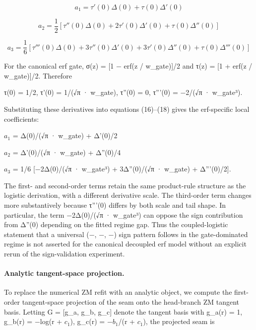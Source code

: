 \documentclass[11pt]{article}
\begin{document}
\begin{equation}
\tag{16}\label{eq:taylor-a1}
a_1 = \tau'(0)\Delta(0) + \tau(0)\Delta'(0)
\end{equation}

\begin{equation}
\tag{17}\label{eq:taylor-a2}
a_2 = \frac{1}{2}\left[\tau''(0)\Delta(0) + 2\tau'(0)\Delta'(0) + \tau(0)\Delta''(0)\right]
\end{equation}

\begin{equation}
\tag{18}\label{eq:taylor-a3}
a_3 = \frac{1}{6}\left[\tau'''(0)\Delta(0) + 3\tau''(0)\Delta'(0) + 3\tau'(0)\Delta''(0) + \tau(0)\Delta'''(0)\right]
\end{equation}

For the canonical erf gate, σ(z) = [1 − erf(z / w\_gate)]/2 and τ(z) = [1 + erf(z / w\_gate)]/2. Therefore

τ(0) = 1/2,    τ'(0) = 1/(√π · w\_gate),    τ''(0) = 0,    τ'''(0) = −2/(√π · w\_gate³).

Substituting these derivatives into equations (16)–(18) gives the erf-specific local coefficients:

$a_1$ = Δ(0)/(√π · w\_gate) + Δ'(0)/2

$a_2$ = Δ'(0)/(√π · w\_gate) + Δ''(0)/4

$a_3$ = 1/6 [−2Δ(0)/(√π · w\_gate³) + 3Δ''(0)/(√π · w\_gate) + Δ'''(0)/2].

The first- and second-order terms retain the same product-rule structure as the logistic derivation, with a different derivative scale. The third-order term changes more substantively because τ'''(0) differs by both scale and tail shape. In particular, the term −2Δ(0)/(√π · w\_gate³) can oppose the sign contribution from Δ''(0) depending on the fitted regime gap. Thus the coupled-logistic statement that a universal (−, −, −) sign pattern follows in the gate-dominated regime is not asserted for the canonical decoupled erf model without an explicit rerun of the sign-validation experiment.

\paragraph{Analytic tangent-space projection.} To replace the numerical ZM refit with an analytic object, we compute the first-order tangent-space projection of the seam onto the head-branch ZM tangent basis. Letting G = [g\_a, g\_b, g\_c] denote the tangent basis with g\_a(r) = 1, g\_b(r) = −log(r + $c_1$), g\_c(r) = −$b_1$/(r + $c_1$), the projected seam is
\end{document}
